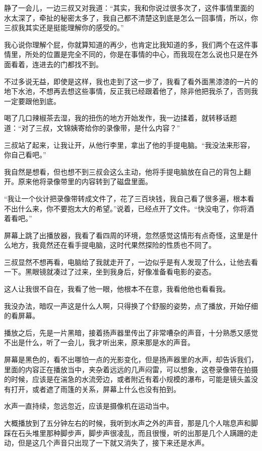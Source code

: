 静了一会儿，一边三叔又对我道：“其实，我和你说过很多次了，这件事情里面的水太深了，牵扯的秘密太多了，我自己都不清楚这到底是怎么一回事情，所以，你三叔我其实还是挺能理解你的感受的。”

我心说你理解个屁，你就算知道的再少，也肯定比我知道的多，我们两个在这件事情里，所处的位置是完全不同的，你是在事情的中心，而我现在怎么说也只是在外面看着，连进去的门都找不到。

不过多说无益，即使是这样，我也走到了这一步了，我看了看外面黑漆漆的一片的地下水池，不想再去想这些事情，反正我已经跟着他了，除非他把我杀了，否则我一定要跟他到底。

喝了几口辣椒茶去湿，我的扭伤的地方开始发作，我一边揉着，就转移话题道：“对了三叔，文锦姨寄给你的录像带，是什么内容？”

三叔站了起来，让我让开，从他行李里，拿出了他的手提电脑。“我没法来形容，你自己看吧。”

我自然是想看，但也想不到三叔会这么主动，他将手提电脑放在自己的背包上翻开。原来他将录像带里的内容转到了磁盘里面。

“我让一个伙计把录像带转成文件了，花了三百块钱，我自己看了很多遍，根本看不出什么来，你不要抱太大的希望。”说着，已经点开了文件。“快没电了，你将酒着看吧。”

屏幕上跳了出播放器，我看了看四周的环境，忽然感觉这情形有点奇怪，这里是什么地方，我竟然还在看手提电脑，这时代果然探险的性质也不同了。

三叔显然不想再看，电脑给了我就走开了，一边似乎是有人发现了什么，让他去看一下。黑眼镜就凑过了过来，坐到我身后，好像准备看电影的姿态。

这人让我很不自在，我看了他一眼，他根本不在意，我看他他也看看我。

我没办法，暗叹一声这是什么人啊，只得换了个舒服的姿势，点了播放，开始仔细的看屏幕。

播放之后，先是一片黑暗，接着扬声器里传出了非常嘈杂的声音，十分熟悉又感觉不出是什么，听了一会儿，我才听出来，原来那是水的声音。

屏幕是黑色的，看不出哪怕一点的光影变化，但是扬声器里的水声，却告诉我们，里面的内容正在播放当中，夹杂着远远的几声闷雷，可以想象，这卷录像带在拍摄的时候，应该是在湍急的水流旁边，或者附近有着小规模的瀑布，可能是镜头盖没有打开，或者遮了雨篷的关系，屏幕上什么也没有拍到。

水声一直持续，忽远忽近，应该是摄像机在运动当中。

大概播放到了五分钟左右的时候，我听到水声之外的声音，那是几个人喘息声和脚踩在石头堆里那种脚步声，脚步声很凌乱，而且很慢，听的出那是几个人蹒跚的走动，但是这几个声音只出现了一下就又消失了，接下来还是水声。

